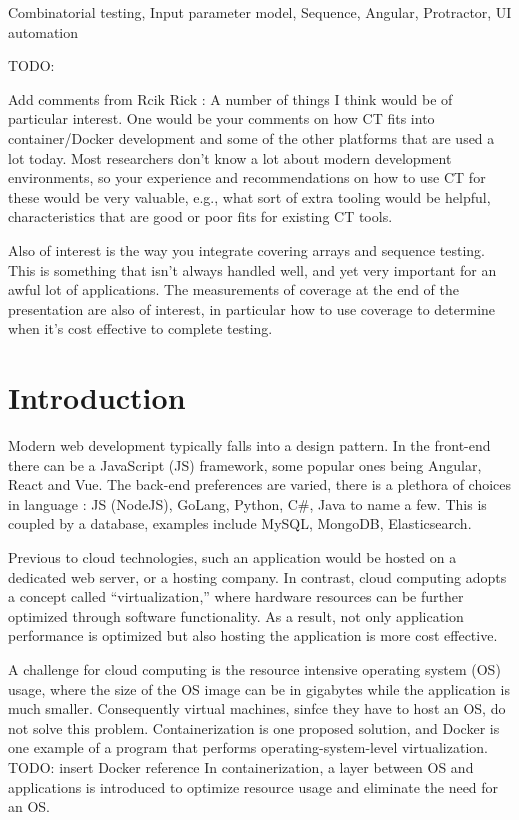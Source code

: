 \documentclass[conference]{IEEEtran}
\newcommand{\todo}[1]{}
\renewcommand{\todo}[1]{{\color{red} TODO: {#1}}}
\begin{document}
\begin{IEEEkeywords}
Combinatorial testing, Input parameter model, Sequence, Angular, Protractor, UI automation
\end{IEEEkeywords}



\todo{ Add comments from Rcik 
Rick : A number of things I think would be of particular interest. 
One would be your comments on how CT fits into container/Docker development and some of the other platforms that are used a lot today. 
Most researchers don’t know a lot about modern development environments, so your experience and recommendations on how to use CT for these would be very valuable, e.g., 
what sort of extra tooling would be helpful, characteristics that are good or poor fits for existing CT tools.

Also of interest is the way you integrate covering arrays and sequence testing.
This is something that isn’t always handled well, and yet very important for an awful lot of applications.
The measurements of coverage at the end of the presentation are also of interest,
in particular how to use coverage to determine when it’s cost effective to complete testing.
}


\section{Introduction}
Modern web development typically falls into a design pattern. In the front-end there can be a JavaScript (JS) framework, some popular ones being Angular, React and Vue.
The back-end preferences are varied, there is a plethora of choices in language : JS (NodeJS), GoLang, Python, C\#, Java to name a few. 
This is coupled by a database, examples include MySQL, MongoDB, Elasticsearch.

Previous to cloud technologies, such an application would be hosted on a dedicated web server, or a hosting company.
In contrast, cloud computing adopts a concept called “virtualization,” where hardware resources can be further optimized through software functionality.
As a result, not only application performance is optimized but also hosting the application is more cost effective.

A challenge for cloud computing is the resource intensive operating system (OS) usage, where the size of the OS image can be in gigabytes while the application is much smaller. 
Consequently virtual machines, sinfce they have to host an OS, do not solve this problem.
Containerization is one proposed solution, and Docker is one example of a program that performs operating-system-level virtualization. 
\todo {insert Docker reference}
In containerization, a layer between OS and applications is introduced to optimize resource usage and eliminate the need for an OS.
\end{document}
